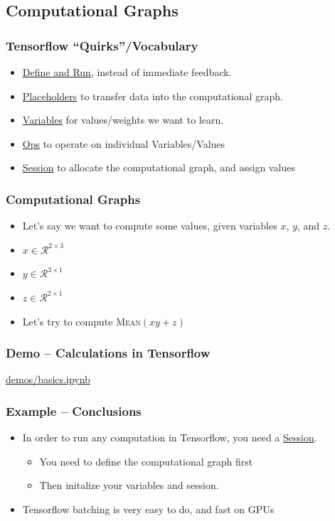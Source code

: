 \documentclass{beamer}
\begin{document}
\subsection{Computational Graphs}

\begin{frame}
  \frametitle{Tensorflow ``Quirks''/Vocabulary}
  \begin{itemize}
  \item \underline{Define and Run}, instead of immediate feedback.
  \item \underline{Placeholders} to transfer data into the computational graph.
  \item \underline{Variables} for values/weights we want to learn.
  \item \underline{Ops} to operate on individual Variables/Values
  \item \underline{Session} to allocate the computational graph, and assign values
  \end{itemize}
\end{frame}

\begin{frame}
  \frametitle{Computational Graphs}
  \begin{itemize}
  \item Let's say we want to compute some values, given variables $x$, $y$, and $z$.
  \item $x \in \mathcal{R}^{2 \times 3}$
  \item $y \in \mathcal{R}^{3 \times 1}$
  \item $z \in \mathcal{R}^{2 \times 1}$
  \item Let's try to compute \textsc{Mean}$(xy + z)$
  \end{itemize}
\end{frame}


\begin{frame}
  \frametitle{Demo -- Calculations in Tensorflow}
  \Huge{\centerline{\href{https://github.com/sig-ai/tf_workshop/blob/master/demos/basics.ipynb}{demos/basics.ipynb}}}
\end{frame}

\begin{frame}
  \frametitle{Example -- Conclusions}
  \begin{itemize}
  \item In order to run any computation in Tensorflow, you need a \underline{Session}.
    \begin{itemize}
    \item You need to define the computational graph first
    \item Then initalize your variables and session.
    \end{itemize}
  \item Tensorflow batching is very easy to do, and fast on GPUs
  \end{itemize}
\end{frame}
\end{document}
